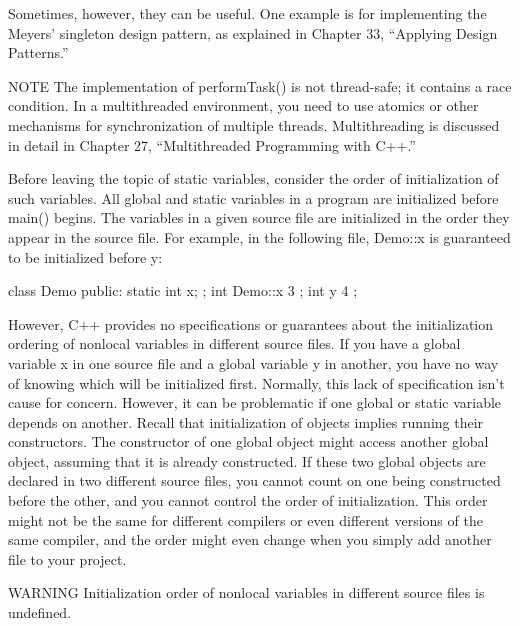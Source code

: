 Sometimes, however, they can be useful. One example is for implementing the Meyers’ singleton design pattern, as explained in Chapter 33, “Applying Design Patterns.”

\begin{myNotic}{NOTE}
The implementation of performTask() is not thread-safe; it contains a race condition. In a multithreaded environment, you need to use atomics or other mechanisms for synchronization of multiple threads. Multithreading is discussed in detail in Chapter 27, “Multithreaded Programming with C++.”
\end{myNotic}


Before leaving the topic of static variables, consider the order of initialization of such variables. All global and static variables in a program are initialized before main() begins. The variables in a given source file are initialized in the order they appear in the source file. For example, in the following file, Demo::x is guaranteed to be initialized before y:

\begin{cpp}
class Demo
{
    public:
        static int x;
};
int Demo::x { 3 };
int y { 4 };
\end{cpp}

However, C++ provides no specifications or guarantees about the initialization ordering of nonlocal variables in different source files. If you have a global variable x in one source file and a global variable y in another, you have no way of knowing which will be initialized first. Normally, this lack of specification isn’t cause for concern. However, it can be problematic if one global or static variable depends on another. Recall that initialization of objects implies running their constructors. The constructor of one global object might access another global object, assuming that it is already constructed. If these two global objects are declared in two different source files, you cannot count on one being constructed before the other, and you cannot control the order of initialization. This order might not be the same for different compilers or even different versions of the same compiler, and the order might even change when you simply add another file to your project.

\begin{myWarning}{WARNING}
Initialization order of nonlocal variables in different source files is undefined.
\end{myWarning}


